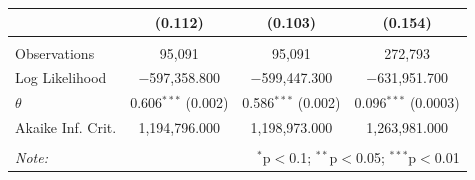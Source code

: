\documentclass[12pt, letterpaper]{article}
\begin{document}
\begin{table}
{\begin{tabular}{@{\extracolsep{5pt}}lccc}
  & (0.112) & (0.103) & (0.154) \\ 
 \hline \\[-1.8ex] 
Observations & 95,091 & 95,091 & 272,793 \\ 
Log Likelihood & $-$597,358.800 & $-$599,447.300 & $-$631,951.700 \\ 
$\theta$ & 0.606$^{***}$  (0.002) & 0.586$^{***}$  (0.002) & 0.096$^{***}$  (0.0003) \\ 
Akaike Inf. Crit. & 1,194,796.000 & 1,198,973.000 & 1,263,981.000 \\ 
\hline 
\hline \\[-1.8ex] 
\textit{Note:}  & \multicolumn{3}{r}{$^{*}$p$<$0.1; $^{**}$p$<$0.05; $^{***}$p$<$0.01} \\ 
\end{tabular} }
\end{table}

\newpage
\end{document}
